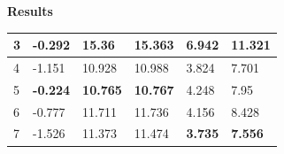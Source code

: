 \documentclass[xcolor=dvipsnames]{beamer}
\begin{document}
\begin{frame}{\bf Results}
\begin{table}[h]
\begin{tabular}{|l|l|l|l|l|l|}
3                                 & -0.292                                                                                        & 15.36                                                                                          & 15.363                                                                               & 6.942                                                                                & 11.321                                                                                           \\ \hline
4                                 & -1.151                                                                                        & 10.928                                                                                         & 10.988                                                                               & 3.824                                                                                & 7.701                                                                                            \\ \hline
5                                 & {\color[HTML]{32CB00} \textbf{-0.224}}                                                        & {\color[HTML]{32CB00} \textbf{10.765}}                                                         & {\color[HTML]{32CB00} \textbf{10.767}}                                               & 4.248                                                                                & 7.95                                                                                             \\ \hline
6                                 & -0.777                                                                                        & 11.711                                                                & 11.736                                                                               & 4.156                                                                                & 8.428                                                                                            \\ \hline
7                                 & -1.526                                                                                        & 11.373                                                                                         & 11.474                                                                               & {\color[HTML]{32CB00} \textbf{3.735}}                                                & {\color[HTML]{32CB00} \textbf{7.556}}                                                            \\ \hline
\end{tabular}
\end{table}

\end{frame}
\end{document}
